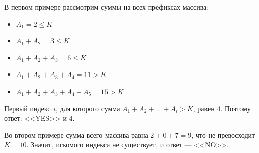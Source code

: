 В первом примере рассмотрим суммы на всех префиксах массива:

\begin{itemize}
\item $A_1 = 2 \le K$
\item $A_1 + A_2 = 3 \le K$
\item $A_1 + A_2 + A_3 = 6 \le K$
\item $A_1 + A_2 + A_3 + A_4 = 11 > K$
\item $A_1 + A_2 + A_3 + A_4 + A_5 = 15 > K$
\end{itemize}

Первый индекс $i$, для которого сумма $A_1 + A_2 + \ldots + A_i > K$, равен $4$. Поэтому ответ: <<YES>> и $4$.

Во втором примере сумма всего массива равна $2 + 0 + 7 = 9$, что не превосходит $K = 10$. Значит, искомого индекса не существует, и ответ --- <<NO>>.